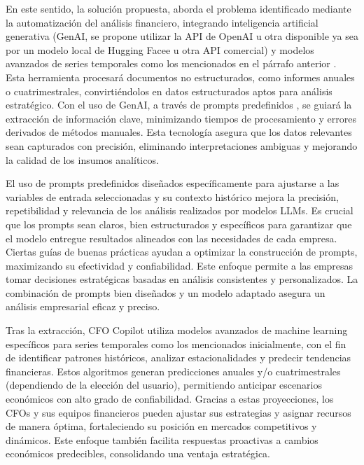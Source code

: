 \documentclass[12pt,letterpaper,oneside]{report}
\renewcommand{\_}{\UnderscoreOriginal\allowbreak}
\begin{document}
En este sentido, la solución propuesta, aborda el problema identificado mediante la automatización del análisis financiero, integrando inteligencia artificial generativa (GenAI, se propone utilizar la API de OpenAI u otra disponible ya sea por un modelo local de Hugging Facee u otra API comercial) y modelos avanzados de series temporales como los mencionados en el párrafo anterior \parencite{Liu2024}. Esta herramienta procesará documentos no estructurados, como informes anuales o cuatrimestrales, convirtiéndolos en datos estructurados aptos para análisis estratégico. Con el uso de GenAI, a través de prompts predefinidos \parencite{Krause2023}, se guiará la extracción de información clave, minimizando tiempos de procesamiento y errores derivados de métodos manuales. Esta tecnología asegura que los datos relevantes sean capturados con precisión, eliminando interpretaciones ambiguas y mejorando la calidad de los insumos analíticos.

El uso de prompts predefinidos diseñados específicamente para ajustarse a las variables de entrada seleccionadas y su contexto histórico mejora la precisión, repetibilidad y relevancia de los análisis realizados por modelos LLMs. Es crucial que los prompts sean claros, bien estructurados y específicos para garantizar que el modelo entregue resultados alineados con las necesidades de cada empresa. Ciertas guías de buenas prácticas ayudan a optimizar la construcción de prompts, maximizando su efectividad y confiabilidad. Este enfoque permite a las empresas tomar decisiones estratégicas basadas en análisis consistentes y personalizados. La combinación de prompts bien diseñados y un modelo adaptado asegura un análisis empresarial eficaz y preciso. \parencite{DairAi2024}

Tras la extracción, CFO Copilot utiliza modelos avanzados de machine learning específicos para series temporales como los mencionados inicialmente, con el fin de identificar patrones históricos, analizar estacionalidades y predecir tendencias financieras. Estos algoritmos generan predicciones anuales y/o cuatrimestrales (dependiendo de la elección del usuario), permitiendo anticipar escenarios económicos con alto grado de confiabilidad. Gracias a estas proyecciones, los CFOs y sus equipos financieros pueden ajustar sus estrategias y asignar recursos de manera óptima, fortaleciendo su posición en mercados competitivos y dinámicos. Este enfoque también facilita respuestas proactivas a cambios económicos predecibles, consolidando una ventaja estratégica.
\end{document}
